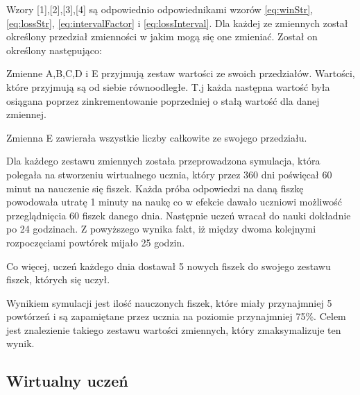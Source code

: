 
Wzory [1],[2],[3],[4] są odpowiednio odpowiednikami wzorów  \ref{eq:winStr}, \ref{eq:lossStr}, \ref{eq:intervalFactor} i \ref{eq:lossInterval}. Dla każdej ze zmiennych został określony przedział zmienności w jakim mogą się one zmieniać. Został on określony następująco:


Zmienne A,B,C,D i E przyjmują zestaw wartości ze swoich przedziałów. Wartości, które przyjmują są od siebie równoodległe. T.j każda następna wartość była osiągana poprzez zinkrementowanie poprzedniej o stałą wartość dla danej zmiennej.

Zmienna E zawierała wszystkie liczby całkowite ze swojego przedziału.
\vspace{5mm}


Dla każdego zestawu zmiennych została przeprowadzona symulacja, która polegała na stworzeniu wirtualnego ucznia, który przez 360 dni poświęcał 60 minut na nauczenie się fiszek. Każda próba odpowiedzi na daną fiszkę powodowała utratę 1 minuty na naukę co w efekcie dawało uczniowi możliwość przeglądnięcia 60 fiszek danego dnia. Następnie uczeń wracał do nauki dokładnie po 24 godzinach. Z powyższego wynika fakt, iż między dwoma kolejnymi rozpoczęciami powtórek mijało 25 godzin.

Co więcej, uczeń każdego dnia dostawał 5 nowych fiszek do swojego zestawu fiszek, których się uczył.

Wynikiem symulacji jest ilość nauczonych fiszek, które miały przynajmniej 5 powtórzeń i są zapamiętane przez ucznia na poziomie przynajmniej 75\%. Celem jest znalezienie takiego zestawu wartości zmiennych, który zmaksymalizuje ten wynik.

\subsection{Wirtualny uczeń}

